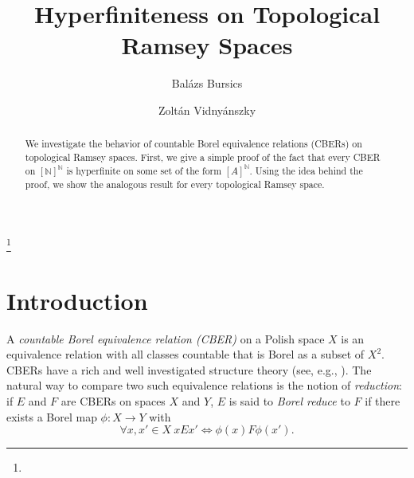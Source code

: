 \documentclass[11pt]{amsart}
\newcommand{\N}{\mathbb{N}}
\theoremstyle{definition}
\numberwithin{equation}{section}
\begin{document}
	
	
	\thanks{}
	
	\keywords{}
	
	
	\title[]{Hyperfiniteness on Topological Ramsey Spaces}
	
	\author{Bal\'azs Bursics}
	
	\address{E\"otv\"os Lor\'and University, Institute of Mathematics, P\'azm\'any P\'eter stny. 1/C, 1117 Budapest, Hungary}
	
	
	
	
	\author{Zolt\'an Vidny\'anszky}
    
	\address{E\"otv\"os Lor\'and University, Institute of Mathematics, P\'azm\'any P\'eter stny. 1/C, 1117 Budapest, Hungary}
	
	
	
	
	
	
	\maketitle
	
	\begin{abstract}
		
		We investigate the behavior of countable Borel equivalence relations (CBERs) on topological Ramsey spaces. First, we give a simple proof of the fact that every CBER on $[\N]^\N$ is hyperfinite on some set of the form $[A]^\N$. Using the idea behind the proof, we show the analogous result for every topological Ramsey space. 
		
		
	\end{abstract}
	
	
	
	
	
	\maketitle
	\section{Introduction}
	A \emph{countable Borel equivalence relation (CBER)} on a Polish space $X$ is an equivalence relation with all classes countable that is Borel as a subset of $X^2$. CBERs have a rich and well investigated structure theory (see, e.g., \cite{kechris2024theory}). The natural way to compare two such equivalence relations is the notion of \emph{reduction}: if $E$ and $F$ are CBERs on spaces $X$ and $Y$, $E$ is said to \emph{Borel reduce} to $F$ if there exists a Borel map $\phi:X \to Y$ with
	\[\forall x,x' \in X \ xEx' \iff \phi(x)F\phi(x').\]
	
\end{document}
